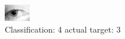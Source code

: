 \begin{figure}[h!]
\begin{center}
\includegraphics[width=0.60\columnwidth]{figures/ID1366_class_4_target_3.png}
\end{center}
\caption{ Classification: 4 actual target: 3}
\label{fig:ID1366_class_4_target_3}
\end{figure}
